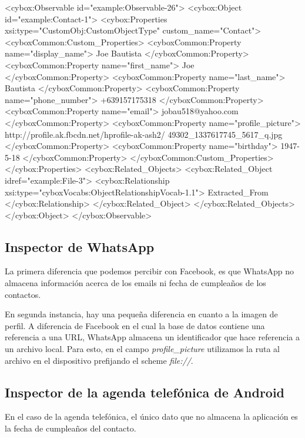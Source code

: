 \begin{xml}
<cybox:Observable id="example:Observable-26">
  <cybox:Object id="example:Contact-1">
    <cybox:Properties xsi:type="CustomObj:CustomObjectType" 
      custom_name="Contact">
      <cyboxCommon:Custom_Properties>
        <cyboxCommon:Property name="display_name">
          Joe Bautista
        </cyboxCommon:Property>
        <cyboxCommon:Property name="first_name">
          Joe
        </cyboxCommon:Property>
        <cyboxCommon:Property name="last_name">
          Bautista
        </cyboxCommon:Property>
        <cyboxCommon:Property name="phone_number">
          +639157175318
        </cyboxCommon:Property>
        <cyboxCommon:Property name="email">
          jobau518@yahoo.com
        </cyboxCommon:Property>
        <cyboxCommon:Property name="profile_picture">
          http://profile.ak.fbcdn.net/hprofile-ak-ash2/
            49302_1337617745_5617_q.jpg
        </cyboxCommon:Property>
        <cyboxCommon:Property name="birthday">
          1947-5-18
        </cyboxCommon:Property>
      </cyboxCommon:Custom_Properties>
    </cybox:Properties>
    <cybox:Related_Objects>
      <cybox:Related_Object idref="example:File-3">
        <cybox:Relationship 
          xsi:type="cyboxVocabs:ObjectRelationshipVocab-1.1">
          Extracted_From
        </cybox:Relationship>
      </cybox:Related_Object>
    </cybox:Related_Objects>
  </cybox:Object>
</cybox:Observable>
\end{xml}

\subsection{Inspector de WhatsApp}
La primera diferencia que podemos percibir con Facebook, es que WhatsApp no almacena información acerca de los emails ni fecha de cumpleaños de los contactos.

En segunda instancia, hay una pequeña diferencia en cuanto a la imagen de perfil. A diferencia de Facebook en el cual la base de datos contiene una referencia a una URL, WhatsApp almacena un identificador que hace referencia a un archivo local. Para esto, en el campo \emph{profile\_picture} utilizamos la ruta al archivo en el dispositivo prefijando el scheme \emph{file://}.

\subsection{Inspector de la agenda telefónica de Android}
En el caso de la agenda telefónica, el único dato que no almacena la aplicación es la fecha de cumpleaños del contacto.

